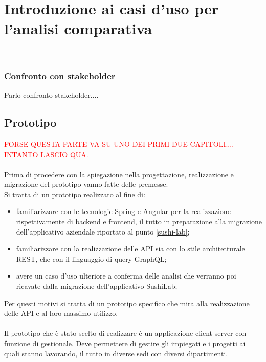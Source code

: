 
\chapter{Introduzione ai casi d'uso per l'analisi comparativa}
\label{cap:casi-uso}

\\
\subsection{Confronto con stakeholder}
Parlo confronto stakeholder....
\section{Prototipo}
\textcolor{red}{FORSE QUESTA PARTE VA SU UNO DEI PRIMI DUE CAPITOLI.... INTANTO LASCIO QUA.}\\\\
Prima di procedere con la spiegazione nella progettazione, realizzazione e migrazione del prototipo vanno fatte delle premesse.\\
Si tratta di un prototipo realizzato al fine di:
\begin{itemize}
  \item familiarizzare con le tecnologie Spring e Angular per la realizzazione rispettivamente di backend e frontend, il tutto in preparazione alla migrazione dell'applicativo aziendale riportato al punto \ref{sushi-lab};
  \item familiarizzare con la realizzazione delle API sia con lo stile architetturale REST, che con il linguaggio di query GraphQL;
  \item avere un caso d'uso ulteriore a conferma delle analisi che verranno poi ricavate dalla migrazione dell'applicativo SushiLab;
\end{itemize}
Per questi motivi si tratta di un prototipo specifico che mira alla realizzazione delle API e al loro massimo utilizzo.\\\\
Il prototipo che è stato scelto di realizzare è un applicazione client-server con funzione di gestionale. Deve permettere di gestire gli impiegati e i progetti ai quali stanno lavorando, il tutto in diverse sedi con diversi dipartimenti.
